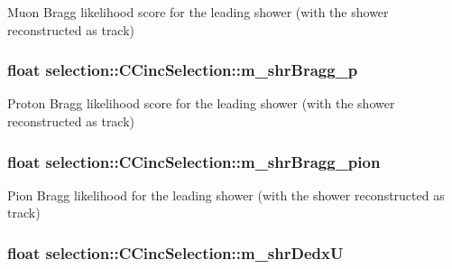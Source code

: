 Muon Bragg likelihood score for the leading shower (with the shower reconstructed as track) \hypertarget{classselection_1_1CCincSelection_a9c533f6915b180797d90b4ad789ffb39}{
\subsubsection[{m\-\_\-shr\-Bragg\-\_\-p}]{\setlength{\rightskip}{0pt plus 5cm}float selection\-::\-C\-Cinc\-Selection\-::m\-\_\-shr\-Bragg\-\_\-p\hspace{0.3cm}{\ttfamily [private]}}}\label{classselection_1_1CCincSelection_a9c533f6915b180797d90b4ad789ffb39}
Proton Bragg likelihood score for the leading shower (with the shower reconstructed as track) \hypertarget{classselection_1_1CCincSelection_aeb3ad1e13e9e94fb9096d40f8c576a6a}{
\subsubsection[{m\-\_\-shr\-Bragg\-\_\-pion}]{\setlength{\rightskip}{0pt plus 5cm}float selection\-::\-C\-Cinc\-Selection\-::m\-\_\-shr\-Bragg\-\_\-pion\hspace{0.3cm}{\ttfamily [private]}}}\label{classselection_1_1CCincSelection_aeb3ad1e13e9e94fb9096d40f8c576a6a}
Pion Bragg likelihood for the leading shower (with the shower reconstructed as track) \hypertarget{classselection_1_1CCincSelection_a8874fb100e151832807ab459419e69d3}{
\subsubsection[{m\-\_\-shr\-Dedx\-U}]{\setlength{\rightskip}{0pt plus 5cm}float selection\-::\-C\-Cinc\-Selection\-::m\-\_\-shr\-Dedx\-U\hspace{0.3cm}{\ttfamily [private]}}}\label{classselection_1_1CCincSelection_a8874fb100e151832807ab459419e69d3}
